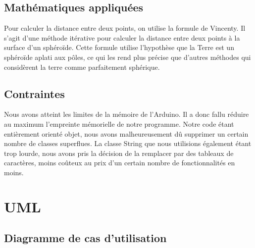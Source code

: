 \documentclass[a4paper,12pt,titlepage]{article}
\begin{document}
\subsection{Mathématiques appliquées}

Pour calculer la distance entre deux points, on utilise la formule de Vincenty.
Il s'agit d'une méthode itérative pour calculer la distance entre deux points à
la surface d'un sphéroïde. Cette formule utilise l'hypothèse que la Terre est un
sphéroïde aplati aux pôles, ce qui les rend plus précise que d’autres méthodes
qui considèrent la terre comme parfaitement sphérique.

\subsection{Contraintes}

Nous avons atteint les limites de la mémoire de l'Arduino. Il a donc fallu
réduire au maximum l'empreinte mémorielle de notre programme. Notre code
étant entièrement orienté objet, nous avons malheureusement dû supprimer un
certain nombre de classes superflues. La classe String que nous utilisions
également étant trop lourde, nous avons pris la décision de la remplacer par
des tableaux de caractères, moins coûteux au prix d'un certain nombre de
fonctionnalités en moins.


\section{UML}

\subsection{Diagramme de cas d'utilisation}
\end{document}
